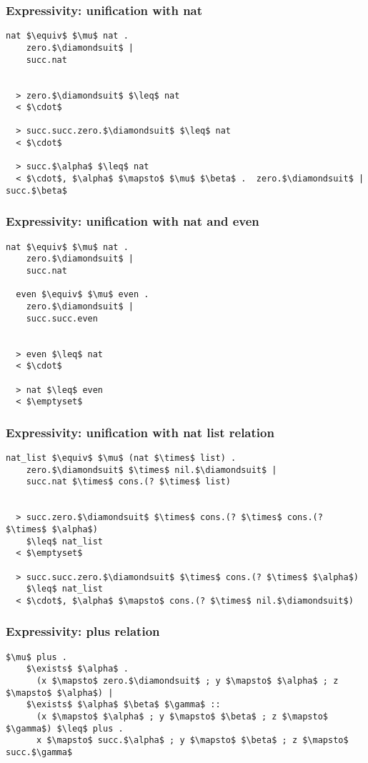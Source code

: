 \documentclass{beamer}
\begin{document}
\begin{frame}[fragile]
  \frametitle{Expressivity: unification with nat}

  \begin{lstlisting}[]
  nat $\equiv$ $\mu$ nat .
    zero.$\diamondsuit$ | 
    succ.nat


  > zero.$\diamondsuit$ $\leq$ nat 
  < $\cdot$

  > succ.succ.zero.$\diamondsuit$ $\leq$ nat 
  < $\cdot$

  > succ.$\alpha$ $\leq$ nat 
  < $\cdot$, $\alpha$ $\mapsto$ $\mu$ $\beta$ .  zero.$\diamondsuit$ | succ.$\beta$
  \end{lstlisting} 

\end{frame}

\begin{frame}[fragile]
  \frametitle{Expressivity: unification with nat and even}

  \begin{lstlisting}[]
  nat $\equiv$ $\mu$ nat .
    zero.$\diamondsuit$ | 
    succ.nat

  even $\equiv$ $\mu$ even .
    zero.$\diamondsuit$ | 
    succ.succ.even 


  > even $\leq$ nat 
  < $\cdot$

  > nat $\leq$ even 
  < $\emptyset$
  \end{lstlisting} 

\end{frame}


\begin{frame}[fragile]
  \frametitle{Expressivity: unification with nat list relation}

  \begin{lstlisting}[]
  nat_list $\equiv$ $\mu$ (nat $\times$ list) .
    zero.$\diamondsuit$ $\times$ nil.$\diamondsuit$ | 
    succ.nat $\times$ cons.(? $\times$ list)


  > succ.zero.$\diamondsuit$ $\times$ cons.(? $\times$ cons.(? $\times$ $\alpha$) 
    $\leq$ nat_list
  < $\emptyset$

  > succ.succ.zero.$\diamondsuit$ $\times$ cons.(? $\times$ $\alpha$) 
    $\leq$ nat_list
  < $\cdot$, $\alpha$ $\mapsto$ cons.(? $\times$ nil.$\diamondsuit$)
  \end{lstlisting} 
\end{frame}


\begin{frame}[fragile]
  \frametitle{Expressivity: plus relation}

  \begin{lstlisting}[]
  $\mu$ plus .
    $\exists$ $\alpha$ . 
      (x $\mapsto$ zero.$\diamondsuit$ ; y $\mapsto$ $\alpha$ ; z $\mapsto$ $\alpha$) |
    $\exists$ $\alpha$ $\beta$ $\gamma$ :: 
      (x $\mapsto$ $\alpha$ ; y $\mapsto$ $\beta$ ; z $\mapsto$ $\gamma$) $\leq$ plus . 
      x $\mapsto$ succ.$\alpha$ ; y $\mapsto$ $\beta$ ; z $\mapsto$ succ.$\gamma$
  \end{lstlisting}
\end{frame}
\end{document}

